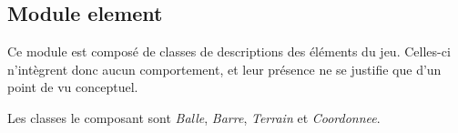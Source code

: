 \subsection{Module element}
\label{sub:Module element}
  \par Ce module est composé de classes de descriptions des éléments du jeu.
  Celles-ci n'intègrent donc aucun comportement, et leur présence ne se justifie que d'un point de vu conceptuel.
  \par Les classes le composant sont \textit{Balle}, \textit{Barre}, \textit{Terrain} et \textit{Coordonnee}.
\pagebreak
